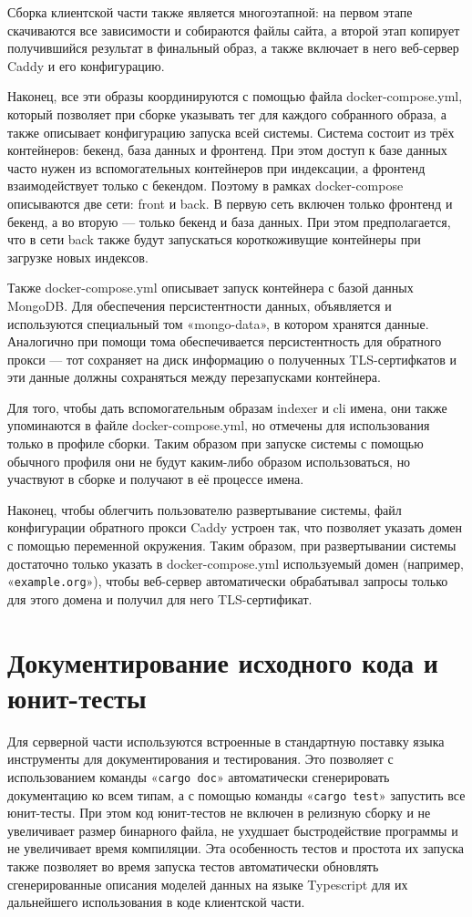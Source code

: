 Сборка клиентской части также является многоэтапной: на первом этапе скачиваются все зависимости и собираются файлы сайта, а второй этап копирует получившийся результат в финальный образ, а также включает в него веб-сервер Caddy и его конфигурацию.

Наконец, все эти образы координируются с помощью файла docker-compose.yml, который позволяет при сборке указывать тег для каждого собранного образа, а также описывает конфигурацию запуска всей системы. Система состоит из трёх контейнеров: бекенд, база данных и фронтенд. При этом доступ к базе данных часто нужен из вспомогательных контейнеров при индексации, а фронтенд взаимодействует только с бекендом. Поэтому в рамках docker-compose описываются две сети: front и back. В первую сеть включен только фронтенд и бекенд, а во вторую — только бекенд и база данных. При этом предполагается, что в сети back также будут запускаться короткоживущие контейнеры при загрузке новых индексов.

Также docker-compose.yml описывает запуск контейнера с базой данных MongoDB. Для обеспечения персистентности данных, объявляется и используются специальный том «mongo-data», в котором хранятся данные. Аналогично при помощи тома обеспечивается персистентность для обратного прокси — тот сохраняет на диск информацию о полученных TLS-сертифкатов и эти данные должны сохраняться между перезапусками контейнера.

Для того, чтобы дать вспомогательным образам indexer и cli имена, они также упоминаются в файле docker-compose.yml, но отмечены для использования только в профиле сборки. Таким образом при запуске системы с помощью обычного профиля они не будут каким-либо образом использоваться, но участвуют в сборке и получают в её процессе имена.

Наконец, чтобы облегчить пользователю развертывание системы, файл конфигурации обратного прокси Caddy устроен так, что позволяет указать домен с помощью переменной окружения. Таким образом, при развертывании системы достаточно только указать в docker-compose.yml используемый домен (например, «\texttt{example.org}»), чтобы веб-сервер автоматически обрабатывал запросы только для этого домена и получил для него TLS-сертификат.

\section{Документирование исходного кода и юнит-тесты}

Для серверной части используются встроенные в стандартную поставку языка инструменты для документирования и тестирования. Это позволяет с использованием команды «\texttt{cargo doc}» автоматически сгенерировать документацию ко всем типам, а с помощью команды «\texttt{cargo test}» запустить все юнит-тесты. При этом код юнит-тестов не включен в релизную сборку и не увеличивает размер бинарного файла, не ухудшает быстродействие программы и не увеличивает время компиляции. Эта особенность тестов и простота их запуска также позволяет во время запуска тестов автоматически обновлять сгенерированные описания моделей данных на языке Typescript для их дальнейшего использования в коде клиентской части.

